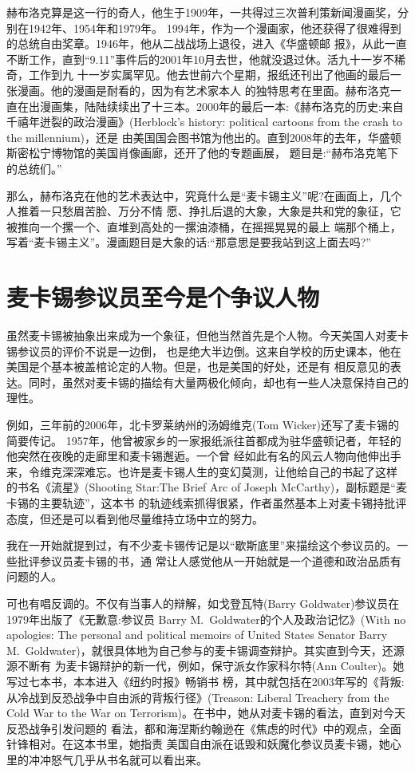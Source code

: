 \documentclass[10pt]{article}
\begin{document}
{赫布洛克算是这一行的奇人，他生于1909年，一共得过三次普利策新闻漫画奖，分别在1942年、1954年和1979年。
1994年，作为一个漫画家，他还获得了很难得到的总统自由奖章。1946年，他从二战战场上退役，进入《华盛顿邮
报》，从此一直不断工作，直到``9.11''事件后的2001年10月去世，他就没退过休。活九十一岁不稀奇，工作到九
十一岁实属罕见。他去世前六个星期，报纸还刊出了他画的最后一张漫画。他的漫画是耐看的，因为有艺术家本人
的独特思考在里面。赫布洛克一直在出漫画集，陆陆续续出了十三本。2000年的最后一本:《赫布洛克的历史:来自
千禧年迸裂的政治漫画》(Herblock's history: political cartoons from the crash to the millennium)，还是
由美国国会图书馆为他出的。直到2008年的去年，华盛顿斯密松宁博物馆的美国肖像画廊，还开了他的专题画展，
题目是:``赫布洛克笔下的总统们。''

那么，赫布洛克在他的艺术表达中，究竟什么是``麦卡锡主义''呢?在画面上，几个人推着一只愁眉苦脸、万分不情
愿、挣扎后退的大象，大象是共和党的象征，它被推向一个摞一个、直堆到高处的一摞油漆桶，在摇摇晃晃的最上
端那个桶上，写着``麦卡锡主义''。漫画题目是大象的话:``那意思是要我站到这上面去吗?''


\pagebreak
\section{麦卡锡参议员至今是个争议人物}

虽然麦卡锡被抽象出来成为一个象征，但他当然首先是个人物。今天美国人对麦卡锡参议员的评价不说是一边倒，
也是绝大半边倒。这来自学校的历史课本，他在美国是个基本被盖棺论定的人物。但是，也是美国的好处，还是有
相反意见的表达。同时，虽然对麦卡锡的描绘有大量两极化倾向，却也有一些人决意保持自己的理性。

例如，三年前的2006年，北卡罗莱纳州的汤姆\textperiodcentered 维克(Tom Wicker)还写了麦卡锡的简要传记。
1957年，他曾被家乡的一家报纸派往首都成为驻华盛顿记者，年轻的他突然在夜晚的走廊里和麦卡锡邂逅。一个曾
经如此有名的风云人物向他伸出手来，令维克深深难忘。也许是麦卡锡人生的变幻莫测，让他给自己的书起了这样
的书名《流星》(Shooting Star:The Brief Arc of Joseph McCarthy)，副标题是``麦卡锡的主要轨迹''，这本书
的轨迹线索抓得很紧，作者虽然基本上对麦卡锡持批评态度，但还是可以看到他尽量维持立场中立的努力。

我在一开始就提到过，有不少麦卡锡传记是以``歇斯底里''来描绘这个参议员的。一些批评参议员麦卡锡的书，通
常让人感觉他从一开始就是一个道德和政治品质有问题的人。

可也有唱反调的。不仅有当事人的辩解，如戈登瓦特(Barry Goldwater)参议员在1979年出版了《无歉意:参议员
Barry M.~Goldwater的个人及政治记忆》(With no apologies: The personal and political memoirs of United
States Senator Barry M.~Goldwater)，就很具体地为自己参与的麦卡锡调查辩护。其实直到今天，还源源不断有
为麦卡锡辩护的新一代，例如，保守派女作家科尔特(Ann Coulter)。她写过七本书，本本进入《纽约时报》畅销书
榜，其中就包括在2003年写的《背叛:从冷战到反恐战争中自由派的背叛行径》(Treason: Liberal Treachery
from the Cold War to the War on Terrorism)。在书中，她从对麦卡锡的看法，直到对今天反恐战争引发问题的
看法，都和海涅斯\textperiodcentered 约翰逊在《焦虑的时代》中的观点，全面针锋相对。在这本书里，她指责
美国自由派在诋毁和妖魔化参议员麦卡锡，她心里的冲冲怒气几乎从书名就可以看出来。

}
\end{document}
